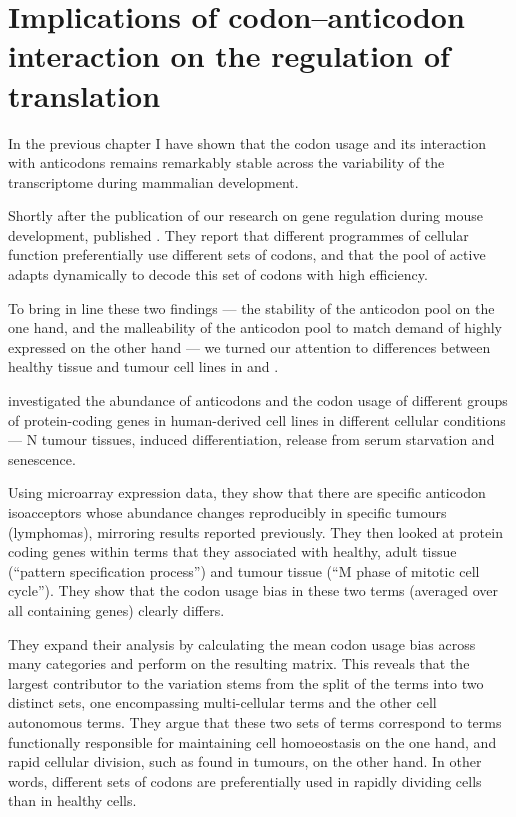 \chapter{Implications of codon–anticodon interaction on the regulation of translation}


In the previous chapter I have shown that the codon usage and its interaction
with \trna anticodons remains remarkably stable across the variability of the
transcriptome during mammalian development.

Shortly after the publication of our research on \trna gene regulation during
mouse development, \citet{Gingold:2014} published . They
report that different programmes of cellular function preferentially use
different sets of codons, and that the pool of active \trna[s] adapts
dynamically to decode this set of codons with high efficiency.


To bring in line these two findings — the stability of the anticodon pool on the
one hand, and the malleability of the anticodon pool to match demand of highly
expressed on the other hand — we turned our attention to differences between
healthy tissue and tumour cell lines in \mmu and \hsa.

\citet{Gingold:2014} investigated the abundance of \trna anticodons and the
codon usage of different groups of protein-coding genes in human-derived cell
lines in different cellular conditions --- N tumour tissues,
induced differentiation, release from serum starvation and senescence.

Using microarray expression data, they show that there are specific anticodon
isoacceptors whose abundance changes reproducibly in specific tumours
(lymphomas), mirroring results reported previously.
They then looked at protein coding genes within \go terms that they associated
with healthy, adult tissue (“pattern specification process”) and tumour tissue
(“M phase of mitotic cell cycle”). They show that the codon usage bias in these
two \go terms (averaged over all containing genes) clearly differs.

They expand their analysis by calculating the mean codon usage bias across many \go categories and perform \pca on the resulting
matrix. This reveals that the largest contributor to the variation stems from
the split of the \go terms into two distinct sets, one encompassing
multi-cellular \go terms and the other cell autonomous \go terms. They argue
that these two sets of \go terms correspond to \go terms functionally
responsible for maintaining cell homoeostasis on the one hand, and rapid
cellular division, such as found in tumours, on the other hand. In other words,
different sets of codons are preferentially used in rapidly dividing cells than
in healthy cells.

